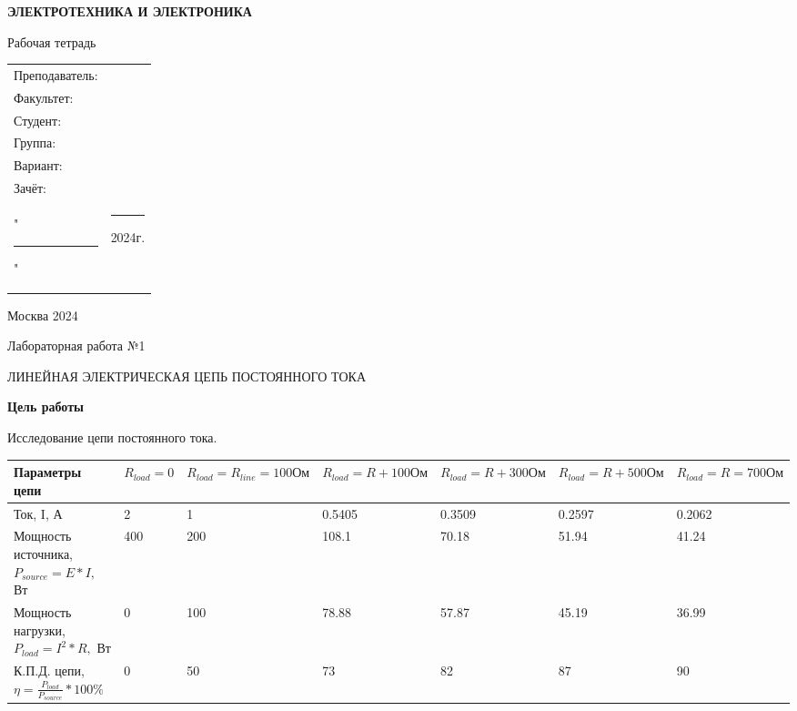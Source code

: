 \documentclass[12pt, a4paper]{report}
\begin{document}
	\begin{titlepage}
		\begin{center}
			\vspace*{5cm}
			\Huge \textbf{ЭЛЕКТРОТЕХНИКА И ЭЛЕКТРОНИКА}

			\vspace{1cm}
			\Huge Рабочая тетрадь
			
			\vspace{5cm}
			\begin{flushright}
				\Large
				\begin{tabular}{>{\raggedleft\arraybackslash}p{5cm} p{8cm}}
					Преподаватель: & \hrulefill \\
					Факультет: & \hrulefill \\
					\large Студент: & \hrulefill \\
					\large Группа: & \hrulefill \\
					\large Вариант: & \hrulefill \\
					\large Зачёт: & \hrulefill \\
					\large "\rule{1cm}{1pt}" & \rule{5cm}{1pt} 2024г. \\
				\end{tabular}
			\end{flushright}

			\vspace*{\fill}
			\Large Москва 2024
		\end{center}
	\end{titlepage}
	

	\begin{center}
		Лабораторная работа №1
		
		\large ЛИНЕЙНАЯ ЭЛЕКТРИЧЕСКАЯ ЦЕПЬ ПОСТОЯННОГО ТОКА	

		\textbf{Цель работы}
	\end{center}
	Исследование цепи постоянного тока.
	\newline

	\begin{tabular}{||M{4cm} | M{1.5cm} | M{1.5cm} | M{1.5cm} | M{1.5cm} | M{1.5cm} | M{1.5cm}||}
		\hline 
		Параметры цепи & \( R_{load} = 0 \) & \( R_{load} = R_{line} = 100 Ом \) & \( R_{load} = R + 100 Ом \) & \( R_{load} = R + 300 Ом \) & \( R_{load} = R + 500 Ом \) & \( R_{load} = R = 700 Ом \) \\

		\hline
		Ток, I, А & 2 & 1 & 0.5405 & 0.3509 & 0.2597 & 0.2062 \\

		\hline 
		Мощность источника, \newline \( P_{source} = E*I, \) Вт & 400 & 200 & 108.1 & 70.18 & 51.94 & 41.24 \\

		\hline
		Мощность нагрузки, \newline \( P_{load} = I^2*R, \) Вт & 0 & 100 & 78.88 & 57.87 & 45.19 & 36.99 \\

		\hline
		К.П.Д. цепи, \newline \( \eta = \frac{P_{load}}{P_{source}}*100\% \) & 0 & 50 & 73 & 82 & 87 & 90 \\
		\hline
	\end{tabular}
\end{document}
